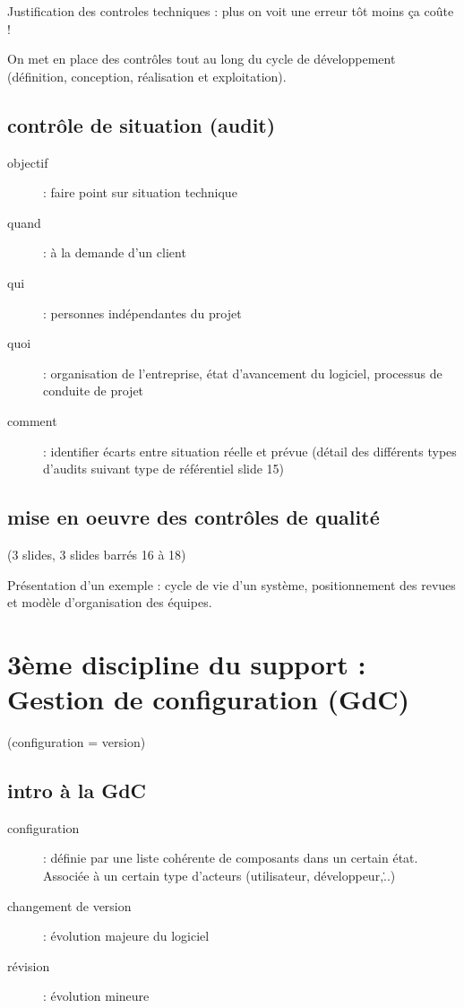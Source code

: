 Justification des controles techniques : plus on voit une erreur tôt moins ça coûte !

On met en place des contrôles tout au long du cycle de développement (définition, conception, réalisation et exploitation).

	\subsection{contrôle de situation (audit)}
	\begin{description}
		\item[objectif] : faire point sur situation technique
		\item[quand] : à la demande d'un client
		\item[qui] : personnes indépendantes du projet
		\item[quoi] : organisation de l’entreprise, état d’avancement du logiciel, processus de conduite de projet
		\item[comment] : identifier écarts entre situation réelle et prévue
(détail des différents types d’audits suivant type de référentiel slide 15)
	\end{description}

	\subsection{mise en oeuvre des contrôles de qualité}

	(3 slides, 3 slides barrés 16 à 18)

	Présentation d’un exemple : cycle de vie d’un système, positionnement des revues et modèle d’organisation des équipes.

\section{3ème discipline du support : Gestion de configuration (GdC)}

(configuration = version)

	\subsection{intro à la GdC}
	\begin{description}
		\item[configuration] : définie par une liste cohérente de composants dans un certain état. Associée à un certain type d’acteurs (utilisateur, développeur,\...)
		\item[changement de version] : évolution majeure du logiciel
		\item[révision] : évolution mineure
	\end{description}

